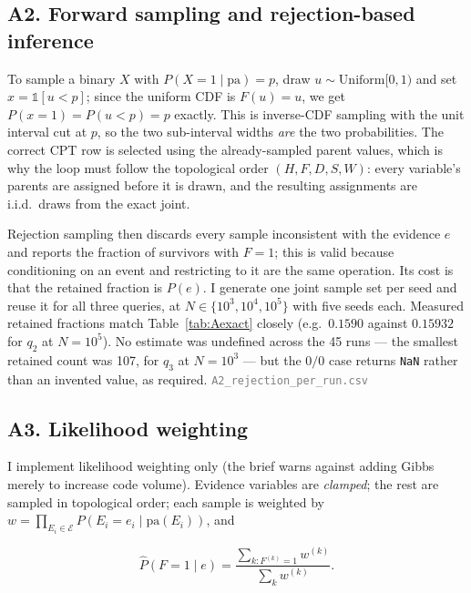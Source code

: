 \documentclass[10pt,a4paper]{article}
\begin{document}
\subsection{A2. Forward sampling and rejection-based inference}

To sample a binary $X$ with $P(X{=}1\mid\text{pa})=p$, draw $u\sim\mathrm{Uniform}[0,1)$ and set
$x=\mathbb{1}[u<p]$; since the uniform CDF is $F(u)=u$, we get $P(x{=}1)=P(u<p)=p$ exactly. This is
inverse-CDF sampling with the unit interval cut at $p$, so the two sub-interval widths \emph{are}
the two probabilities. The correct CPT row is selected using the already-sampled parent values,
which is why the loop must follow the topological order $(H,F,D,S,W)$: every variable's parents are
assigned before it is drawn, and the resulting assignments are i.i.d.\ draws from the exact joint.

Rejection sampling then discards every sample inconsistent with the evidence $e$ and reports the
fraction of survivors with $F{=}1$; this is valid because conditioning on an event and restricting
to it are the same operation. Its cost is that the retained fraction is $P(e)$. I generate one joint
sample set per seed and reuse it for all three queries, at $N\in\{10^3,10^4,10^5\}$ with five seeds
each. Measured retained fractions match Table~\ref{tab:Aexact} closely (e.g.\ $0.1590$ against
$0.15932$ for $q_2$ at $N{=}10^5$). No estimate was undefined across the 45 runs --- the smallest
retained count was 107, for $q_3$ at $N{=}10^3$ --- but the $0/0$ case returns \texttt{NaN} rather
than an invented value, as required.
\textcolor{gray}{\small\texttt{A2\_rejection\_per\_run.csv}}

\subsection{A3. Likelihood weighting}

I implement likelihood weighting only (the brief warns against adding Gibbs merely to increase code
volume). Evidence variables are \emph{clamped}; the rest are sampled in topological order; each
sample is weighted by $w=\prod_{E_i\in\mathcal{E}}P(E_i{=}e_i\mid\mathrm{pa}(E_i))$, and

\vspace{-3pt}
\[
\hat P(F{=}1\mid e)=\frac{\sum_{k:F^{(k)}=1}w^{(k)}}{\sum_k w^{(k)}}.
\]
\end{document}
